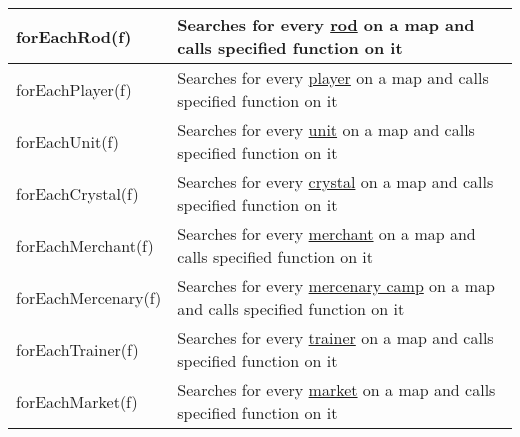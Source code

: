 \begin{center}
\begin{tabularx}{\linewidth}{| l | X |}
\hline
forEachRod(f) & Searches for every \hyperref[Rod]{rod} on a map and calls specified function on it\\
\hline
forEachPlayer(f) & Searches for every \hyperref[Player]{player} on a map and calls specified function on it\\
\hline
forEachUnit(f) & Searches for every \hyperref[Unit]{unit} on a map and calls specified function on it\\
\hline
forEachCrystal(f) & Searches for every \hyperref[Crystal]{crystal} on a map and calls specified function on it\\
\hline
forEachMerchant(f) & Searches for every \hyperref[Merchant]{merchant} on a map and calls specified function on it\\
\hline
forEachMercenary(f) & Searches for every \hyperref[Mercenary]{mercenary camp} on a map and calls specified function on it\\
\hline
forEachTrainer(f) & Searches for every \hyperref[Trainer]{trainer} on a map and calls specified function on it\\
\hline
forEachMarket(f) & Searches for every \hyperref[ResourceMarket]{market} on a map and calls specified function on it\\
\hline
\end{tabularx}
\end{center}